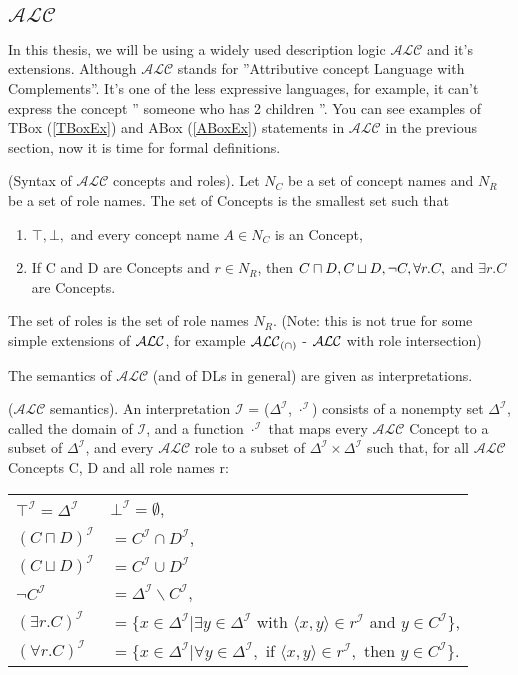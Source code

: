 \subsection{$\mathcal{ALC}$}
In this thesis, we will be using a widely used description logic $\mathcal{ALC}$ and it's extensions. Although
$\mathcal{ALC}$ stands for ''Attributive concept Language with Complements''. It's one of the less expressive languages, for example, it can't express the concept '' someone who has 2 children ''.
You can see examples of TBox (\ref{TBoxEx}) and ABox (\ref{ABoxEx}) statements in $\mathcal{ALC}$ in the previous section, now it is time for formal definitions. 
\begin{mydef} 
\label{ALCsyntax}
\cite{handbook2}
(Syntax of $\mathcal{ALC}$ concepts and roles). Let $N_C$ be a set of concept names and $N_R$ be a set of
role names. The set of Concepts is the smallest set such that
\begin{enumerate}
\item $ \top, \bot,$ and every concept name $A \in N_C$ is an Concept,
\item  If C and D are Concepts and $r \in N_R$, then $C \sqcap D,\\ C \sqcup D , \neg C, \forall r.C,$ and $\exists r.C$ are Concepts.
\end{enumerate}
The set of roles is the set of role names $N_R$. (Note: this is not true for some simple extensions of $\mathcal{ALC}$, for example $\mathcal{ALC} _{(\cap)}$ - $\mathcal{ALC}$ with role intersection)  
\end{mydef}
The semantics of $\mathcal{ALC}$ (and of DLs in general) are given as interpretations. 
\begin{mydef}
\label{ALCsemantics}
\cite{handbook2} 
($\mathcal{ALC}$ semantics). An interpretation $\mathcal{I}$ = ($\Delta ^\mathcal{I}$, $\cdot ^\mathcal{I}$) consists of a nonempty
set $\Delta ^\mathcal{I}$, called the domain of $\mathcal{I}$, and a function $\cdot ^\mathcal{I}$ that maps every $\mathcal{ALC}$ Concept
to a subset of $\Delta ^\mathcal{I}$, and every $\mathcal{ALC}$ role to a subset of $\Delta ^\mathcal{I} \times \Delta ^\mathcal{I}$ such that, for all $\mathcal{ALC}$ Concepts C, D and all role names r:\\
\begin{tabular}{l l}
 $\top ^\mathcal{I} = \Delta^\mathcal{I}$ & $\bot ^\mathcal{I} = \emptyset $, \\
$(C \sqcap D)^\mathcal{I}$ & $= C^\mathcal{I} \cap D^\mathcal{I}$,\\
 $(C \sqcup D) ^\mathcal{I}$ & $= C^\mathcal{I} \cup D^\mathcal{I}$\\
 $\neg C^\mathcal{I}$ & $= \Delta^\mathcal{I} \backslash C^\mathcal{I}$, \\
 $ (\exists r.C)^\mathcal{I}$ & $= \{x \in \Delta ^\mathcal{I} | \exists y \in \Delta ^\mathcal{I} $ with  $\langle x, y \rangle \in r^\mathcal{I}$ and $y \in C^\mathcal{I}\}$,\\
 $(\forall r.C)^\mathcal{I}$ & $= \{x \in \Delta ^\mathcal{I} | \forall y \in \Delta ^\mathcal{I},$ if $\langle x, y \rangle \in  r^\mathcal{I},$ then  $y \in C^\mathcal{I}\}$.\\
\end{tabular}
\end{mydef}
